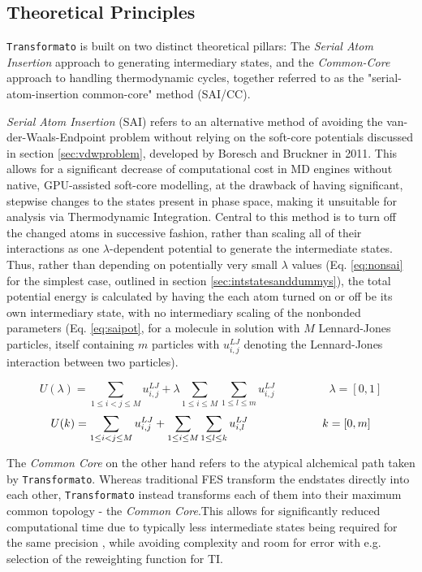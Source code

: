 \documentclass[oneside]{scrreprt}
\begin{document}
\subsection{Theoretical Principles} \label{sec:tf_principles}
\texttt{Transformato} is built on two distinct theoretical pillars: The \emph{Serial Atom Insertion} approach to generating intermediary states, and the \emph{Common-Core} approach to handling thermodynamic cycles, together referred to as the "serial-atom-insertion common-core" method (SAI/CC).

\emph{Serial Atom Insertion} (SAI)\cite{boresch_avoiding_2011} refers to an alternative method of avoiding the van-der-Waals-Endpoint problem without relying on the soft-core potentials discussed in section \ref{sec:vdwproblem}, developed by Boresch and Bruckner in 2011. This allows for a significant decrease of computational cost in MD engines without native, GPU-assisted soft-core modelling, at the drawback of having significant, stepwise changes to the states present in phase space, making it unsuitable for analysis via Thermodynamic Integration. Central to this method is to turn off the changed atoms in successive fashion, rather than scaling all of their interactions as one $\lambda$-dependent potential to generate the intermediate states. Thus, rather than depending on potentially very small $\lambda$ values (Eq. \ref{eq:nonsai} for the simplest case, outlined in section \ref{sec:intstatesanddummys}), the total potential energy is calculated by having the each atom turned on or off be its own intermediary state, with no intermediary scaling of the nonbonded parameters (Eq. \ref{eq:saipot}, for a molecule in solution with $M$ Lennard-Jones particles, itself containing $m$ particles with $u^{LJ}_{i,j}$ denoting the Lennard-Jones interaction between two particles).

\begin{equation}\label{eq:nonsai}
    U(\lambda)=\sum_{1\leq i<j \leq M} u^{LJ}_{i,j}+\lambda \sum_{1 \leq i \leq M} \sum_{1 \leq l \leq m} u^{LJ}_{i,j} \hspace{2cm} \lambda=[0,1]
\end{equation}
\begin{equation}\label{eq:saipot}
    U(k)=\sum_{1\leq i<j \leq M} u^{LJ}_{i,j}+\sum_{1 \leq i \leq M} \sum_{1 \leq l \leq k} u^{LJ}_{i,l} \hspace{2.3cm} k=[0,m]
\end{equation}

The \emph{Common Core} \cite{Wieder2022Jun,braunsfeldImplementationTestingCHARMM} on the other hand refers to the atypical alchemical path taken by \texttt{Transformato}. Whereas traditional FES transform the endstates directly into each other, \texttt{Transformato} instead transforms each of them into their maximum common topology - the \emph{Common Core}.This allows for significantly reduced computational time due to typically less intermediate states being required for the same precision \cite{Karwou2022Jun}, while avoiding complexity and room for error with e.g. selection of the reweighting function for TI.
\end{document}
